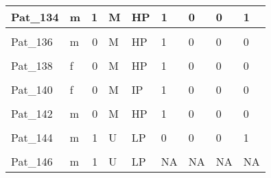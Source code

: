 \documentclass[11pt, a4paper, twosided]{book}
\begin{document}
\begin{longtable}[t]{l|l|r|l|l|l|l|l|l}
\hline
Pat\_134 & m & 1 & M & HP & 1 & 0 & 0 & 1\\
\hline
\cellcolor[HTML]{E2E868}{Pat\_135} & \cellcolor[HTML]{E2E868}{m} & \cellcolor[HTML]{E2E868}{0} & \cellcolor[HTML]{E2E868}{M} & \cellcolor[HTML]{E2E868}{HP} & \cellcolor[HTML]{E2E868}{1} & \cellcolor[HTML]{E2E868}{0} & \cellcolor[HTML]{E2E868}{0} & \cellcolor[HTML]{E2E868}{0}\\
\hline
Pat\_136 & m & 0 & M & HP & 1 & 0 & 0 & 0\\
\hline
\cellcolor[HTML]{E2E868}{Pat\_137} & \cellcolor[HTML]{E2E868}{f} & \cellcolor[HTML]{E2E868}{0} & \cellcolor[HTML]{E2E868}{U} & \cellcolor[HTML]{E2E868}{LP} & \cellcolor[HTML]{E2E868}{0} & \cellcolor[HTML]{E2E868}{0} & \cellcolor[HTML]{E2E868}{1} & \cellcolor[HTML]{E2E868}{0}\\
\hline
Pat\_138 & f & 0 & M & HP & 1 & 0 & 0 & 0\\
\hline
\cellcolor[HTML]{E2E868}{Pat\_139} & \cellcolor[HTML]{E2E868}{f} & \cellcolor[HTML]{E2E868}{0} & \cellcolor[HTML]{E2E868}{M} & \cellcolor[HTML]{E2E868}{HP} & \cellcolor[HTML]{E2E868}{NA} & \cellcolor[HTML]{E2E868}{NA} & \cellcolor[HTML]{E2E868}{NA} & \cellcolor[HTML]{E2E868}{NA}\\
\hline
Pat\_140 & f & 0 & M & IP & 1 & 0 & 0 & 0\\
\hline
\cellcolor[HTML]{E2E868}{Pat\_141} & \cellcolor[HTML]{E2E868}{m} & \cellcolor[HTML]{E2E868}{0} & \cellcolor[HTML]{E2E868}{M} & \cellcolor[HTML]{E2E868}{IP} & \cellcolor[HTML]{E2E868}{1} & \cellcolor[HTML]{E2E868}{0} & \cellcolor[HTML]{E2E868}{0} & \cellcolor[HTML]{E2E868}{0}\\
\hline
Pat\_142 & m & 0 & M & HP & 1 & 0 & 0 & 0\\
\hline
\cellcolor[HTML]{E2E868}{Pat\_143} & \cellcolor[HTML]{E2E868}{f} & \cellcolor[HTML]{E2E868}{0} & \cellcolor[HTML]{E2E868}{U} & \cellcolor[HTML]{E2E868}{LP} & \cellcolor[HTML]{E2E868}{1} & \cellcolor[HTML]{E2E868}{0} & \cellcolor[HTML]{E2E868}{0} & \cellcolor[HTML]{E2E868}{0}\\
\hline
Pat\_144 & m & 1 & U & LP & 0 & 0 & 0 & 1\\
\hline
\cellcolor[HTML]{E2E868}{Pat\_145} & \cellcolor[HTML]{E2E868}{f} & \cellcolor[HTML]{E2E868}{0} & \cellcolor[HTML]{E2E868}{M} & \cellcolor[HTML]{E2E868}{HP} & \cellcolor[HTML]{E2E868}{0} & \cellcolor[HTML]{E2E868}{0} & \cellcolor[HTML]{E2E868}{0} & \cellcolor[HTML]{E2E868}{0}\\
\hline
Pat\_146 & m & 1 & U & LP & NA & NA & NA & NA\\
\hline

\end{longtable}
\end{document}
